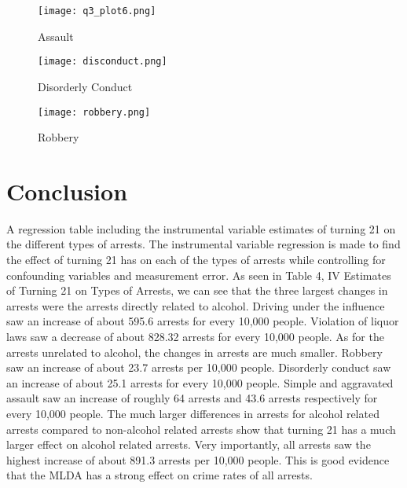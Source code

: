 \documentclass[a4paper]{article}
\begin{document}
\begin{figure}[H]
    \centering
    \caption{Assault}
    \texttt{[image: q3\_plot6.png]}
    \label{fig:my_label}
\end{figure}

\begin{figure}[H]
    \centering
    \caption{Disorderly Conduct}
    \texttt{[image: disconduct.png]}
    \label{fig:my_label}
\end{figure}

\begin{figure}[h!]
    \centering
    \caption{Robbery}
    \texttt{[image: robbery.png]}
    \label{fig:my_label}
\end{figure}

\section{Conclusion}
 
A regression table including the instrumental variable estimates of turning 21 on the different types of arrests. The instrumental variable regression is made to find the effect of turning 21 has on each of the types of arrests while controlling for confounding variables and measurement error. As seen in Table 4, IV Estimates of Turning 21 on Types of Arrests, we can see that the three largest changes in arrests were the arrests directly related to alcohol. Driving under the influence saw an increase of about 595.6 arrests for every 10,000 people. Violation of liquor laws saw a decrease of about 828.32 arrests for every 10,000 people. As for the arrests unrelated to alcohol, the changes in arrests are much smaller. Robbery saw an increase of about 23.7 arrests per 10,000 people. Disorderly conduct saw an increase of about 25.1 arrests for every 10,000 people. Simple and aggravated assault saw an increase of roughly 64 arrests and 43.6 arrests respectively for every 10,000 people. The much larger differences in arrests for alcohol related arrests compared to non-alcohol related arrests show that turning 21 has a much larger effect on alcohol related arrests. Very importantly, all arrests saw the highest increase of about 891.3 arrests per 10,000 people. This is good evidence that the MLDA has a strong effect on crime rates of all arrests.  
\end{document}
